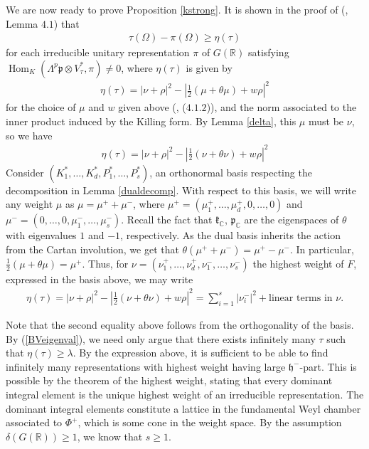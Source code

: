 \documentclass[11pt,reqno]{amsart}
\numberwithin{equation}{section}
\theoremstyle{definition}
\theoremstyle{remark}
\newcommand{\Hom}{\operatorname{Hom}}
\newcommand{\mf}[1]{\mathfrak{#1}}
\newcommand{\C}{\mathbb{C}}
\newcommand{\R}{\mathbb{R}}
\begin{document}
\noindent We are now ready to prove Proposition \ref{kstrong}. It is shown in the proof of (\cite{BV}, Lemma $4.1$) that 
\begin{align}\label{BVeigenval}
    \tau(\Omega)-\pi(\Omega)\geq \eta(\tau)
\end{align}
for each irreducible unitary representation $\pi$ of $G(\R)$ satisfying $\Hom_K(\Lambda^p\mf{p}\otimes V_\tau^*,\pi)\neq 0$, where $\eta(\tau)$ is given by
\begin{align}\label{delta}
    \eta(\tau) = |\nu+\rho|^2-\left|\frac12(\mu+\theta\mu)+w\rho\right|^2
\end{align}
for the choice of $\mu$ and $w$ given above (\cite{BV}, ($4.1.2$)), and the norm associated to the inner product induced by the Killing form. By Lemma \ref{delta}, this $\mu$ must be $\nu$, so we have
\begin{align*}
    \eta(\tau) = |\nu+\rho|^2-\left|\frac12(\nu+\theta\nu)+w\rho\right|^2
\end{align*}
Consider $(K_1^*,\dots,K_d^*,P_1^*,\dots,P_s^*)$, an orthonormal basis respecting the decomposition in Lemma \ref{dualdecomp}. With respect to this basis, we will write any weight $\mu$ as $\mu=\mu^++ \mu^-$, where $\mu^+=(\mu^+_1,\dots,\mu^+_d,0,\dots,0)$ and $\mu^-=(0,\dots,0,\mu^-_1,\dots,\mu^-_s)$. Recall the fact that $\mf{k}_\C$, $\mf{p}_\C$ are the eigenspaces of $\theta$ with eigenvalues $1$ and $-1$, respectively. As the dual basis inherits the action from the Cartan involution, we get that $\theta(\mu^++ \mu^-)=\mu^+- \mu^-$. In particular, $\frac12(\mu+\theta\mu) = \mu^+$. Thus, for $\nu=(\nu_1^+,\dots,\nu_d^+,\nu_1^-,\dots,\nu_s^-)$ the highest weight of $F$, expressed in the basis above, we may write
\begin{align}\label{eta}
    \eta(\tau) = |\nu+\rho|^2-\left\vert\frac12(\nu+\theta\nu)+w\rho\right\vert^2 = \sum_{i=1}^s |\nu_i^-|^2+\text{linear terms in }\nu.
\end{align}

\noindent Note that the second equality above follows from the orthogonality of the basis. By (\ref{BVeigenval}), we need only argue that there exists infinitely many $\tau$ such that $\eta(\tau)\geq \lambda$. By the expression above, it is sufficient to be able to find infinitely many representations with highest weight having large $\mf{h}^-$-part. This is possible by the theorem of the highest weight, stating that every dominant integral element is the unique highest weight of an irreducible representation. The dominant integral elements constitute a lattice in the fundamental Weyl chamber associated to $\Phi^+$, which is some cone in the weight space. By the assumption $\delta(G(\R))\geq 1$, we know that $s\geq 1$. 
\end{document}
